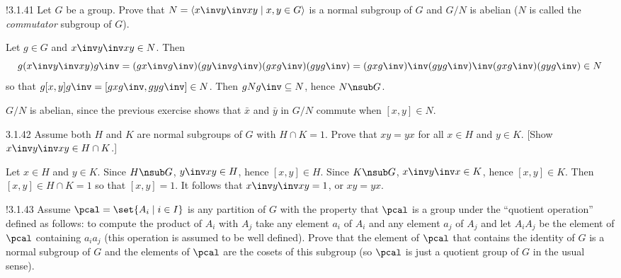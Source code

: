 \begin{exercise}!{3.1.41}
    Let $G$ be a group.
	Prove that $N = \langle x\inv y\inv xy \mid x,y \in G \rangle$ is a normal subgroup of $G$ and $G/N$ is abelian ($N$ is called the \emph{commutator} subgroup of $G$).
\end{exercise}

\begin{sol}
    Let $g \in G$ and $x\inv y\inv xy \in N$.
	Then 
    \[
    	g(x\inv y\inv xy)g\inv = (gx\inv g\inv)(g y\inv g\inv)(gxg\inv)(gyg\inv) = (gxg\inv)\inv(gyg\inv)\inv(gxg\inv)(gyg\inv) \in N
    \]
    so that $g[x, y]g\inv = [gxg\inv, gyg\inv] \in N$.
	Then $gNg\inv \subseteq N$, hence $N \nsub G$.
    
    $G/N$ is abelian, since the previous exercise shows that $\bar x$ and $\bar y$ in $G/N$ commute when $[x, y] \in N$.
\end{sol}

\begin{exercise}{3.1.42}
    Assume both $H$ and $K$ are normal subgroups of $G$ with $H \cap K = 1$.
	Prove that $xy = yx$ for all $x \in H$ and $y \in K$. [Show $x\inv y\inv xy \in H \cap K$.]
\end{exercise}

\begin{sol}
    Let $x \in H$ and $y \in K$.
	Since $H \nsub G$, $y\inv xy \in H$, hence $[x, y] \in H$.
	Since $K \nsub G$, $x\inv y\inv x\in K$, hence $[x, y] \in K$.
	Then $[x, y] \in H \cap K = 1$ so that $[x, y] = 1$.
	It follows that $x\inv y\inv xy = 1$, or $xy = yx$.
\end{sol}

\begin{exercise}!{3.1.43}
    Assume $\pcal = \set{A_i \mid i \in I}$ is any partition of $G$ with the property that $\pcal$ is a group under the ``quotient operation'' defined as follows: to compute the product of $A_i$ with $A_j$ take any element $a_i$ of $A_i$ and any element $a_j$ of $A_j$ and let $A_iA_j$ be the element of $\pcal$ containing $a_ia_j$ (this operation is assumed to be well defined).
	Prove that the element of $\pcal$ that contains the identity of $G$ is a normal subgroup of $G$ and the elements of $\pcal$ are the cosets of this subgroup (so $\pcal$ is just a quotient group of $G$ in the usual sense).
\end{exercise}

